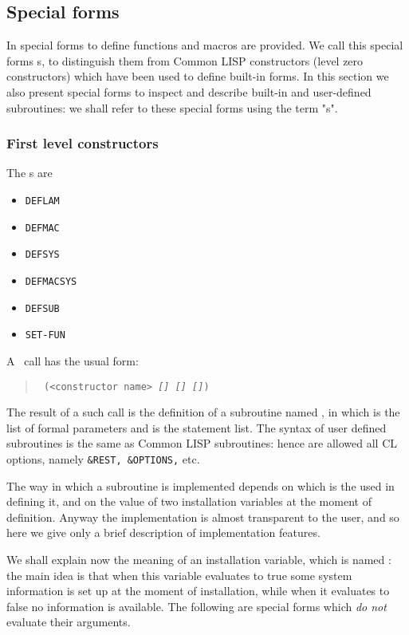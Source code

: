 \subsection{Special forms}

In {\HG} special forms to define functions and macros are provided.
We call this special forms \flconst s, to distinguish them from Common LISP
constructors (level zero constructors) which have been used to define built-in
forms. 
In this section we also present {\HG} special forms to inspect and describe
built-in and user-defined subroutines: we shall refer to these special forms
using the term "\flrec s".


\subsubsection{First level constructors}

The \flconst s are

\begin{itemize}
	\item {\tt DEFLAM}
	\item {\tt DEFMAC}
	\item {\tt DEFSYS}
	\item {\tt DEFMACSYS}
	\item {\tt DEFSUB}
	\item {\tt SET-FUN}
\end{itemize}

A \flconst\ call has the usual form:

\begin{quote}\tt
	(<constructor name> {\it [\sbrna] [\sbral] [\sbrbo]})
\end{quote}

The result of a such call is the definition of a subroutine named {\it \sbrna},
in which {\it \sbral\/} is the list of formal parameters and {\it \sbrbo\/} is
the statement list.
The syntax of user defined {\HG} subroutines is the same as Common LISP
subroutines: hence are allowed all CL options, namely {\tt \&REST, \&OPTIONS,}
etc.

The way in which a subroutine is implemented depends on which is the \flconst
used in defining it, and on the value of two installation variables at the
moment of definition.
Anyway the implementation is almost transparent to the user, and so here we give
only a brief description of implementation features.

We shall explain now the meaning of an installation variable, which is named
{\tt \infmode}: the main idea is that when this variable evaluates to true some
system information is set up at the moment of installation, while when it
evaluates to false no information is available.
The following are special forms which {\it do not} evaluate their arguments.

